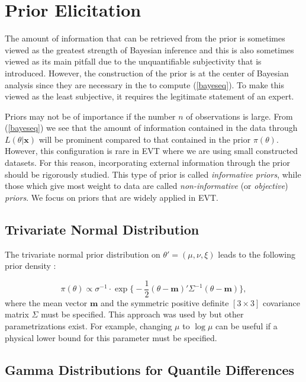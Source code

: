 \section{Prior Elicitation}\label{sec:prior}


The amount of information that can be retrieved from the prior is sometimes viewed as the greatest strength of Bayesian inference and this is also sometimes viewed as its main pitfall due to the unquantifiable subjectivity that is introduced. However, the construction of the prior is at the center of Bayesian analysis since they are necessary in the to compute (\ref{bayeseq}). To make this viewed as the least subjective, it requires the legitimate statement of an expert.

Priors may not be of importance if the number $n$ of observations is large. From (\ref{bayeseq}) we see that the amount of information contained in the data through $L(\theta|\boldsymbol{x})$ will be prominent compared to that contained in the prior $\pi(\theta)$.
However, this configuration is rare in EVT where we are using small constructed datasets. For this reason, incorporating external information through the prior should be rigorously studied. This type of prior is called \emph{informative priors}, while those which give most weight to data are called \emph{non-informative} (or \emph{objective}) \emph{priors}. We focus on priors that are widely applied in EVT.




\subsection{Trivariate Normal Distribution}\label{sec:trivnorm}

The trivariate normal prior distribution on $\theta'=(\mu, \nu,\xi)$ leads to the following prior density :

\begin{equation}
\pi(\theta) \propto \sigma^{-1}\cdot \exp\bigg\{-\frac{1}{2}(\theta-\boldsymbol{m})'\Sigma^{-1}(\theta-\boldsymbol{m})\bigg\},
\end{equation}
where the mean vector $\boldsymbol{m}$ and the symmetric positive definite $[3\times 3]$ covariance matrix $\Sigma$ must be specified. This approach was used by \citet{coles_1996_bay} but other parametrizations exist. For example, changing $\mu$ to $\log \mu$ can be useful if a physical lower bound for this parameter must be specified.


\subsection{Gamma Distributions for Quantile Differences}

